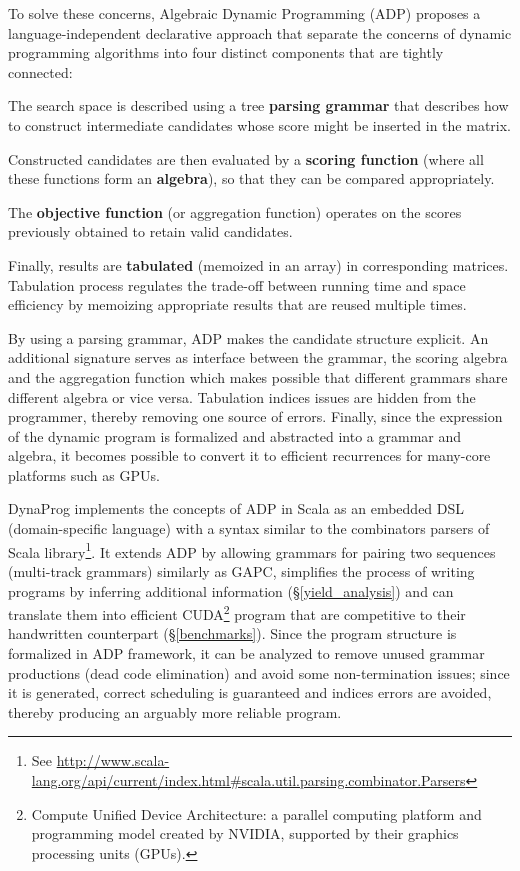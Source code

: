To solve these concerns, Algebraic Dynamic Programming (ADP) \cite{adp} proposes a language-independent declarative approach that separate the concerns of dynamic programming algorithms into four distinct components that are tightly connected:\ol
\item The search space is described using a tree \textbf{parsing grammar} that describes how to construct intermediate candidates whose score might be inserted in the matrix.
\item Constructed candidates are then evaluated by a \textbf{scoring function} (where all these functions form an \textbf{algebra}), so that they can be compared appropriately.
\item The \textbf{objective function} (or aggregation function) operates on the scores previously obtained to retain valid candidates.
\item Finally, results are \textbf{tabulated} (memoized in an array) in corresponding matrices. Tabulation process regulates the trade-off between running time and space efficiency by memoizing appropriate results that are reused multiple times.
\ole

By using a parsing grammar, ADP makes the candidate structure explicit. An additional signature serves as interface between the grammar, the scoring algebra and the aggregation function which makes possible that different grammars share different algebra or vice versa. Tabulation indices issues are hidden from the programmer, thereby removing one source of errors. Finally, since the expression of the dynamic program is formalized and abstracted into a grammar and algebra, it becomes possible to convert it to efficient recurrences for many-core platforms such as GPUs. \cite{adp_gpu}

DynaProg implements the concepts of ADP in Scala as an embedded DSL (domain-specific language) with a syntax similar to the combinators parsers of Scala library\footnote{See \url{http://www.scala-lang.org/api/current/index.html\#scala.util.parsing.combinator.Parsers}}. It extends ADP by allowing grammars for pairing two sequences (multi-track grammars) similarly as GAPC\cite{gapc_thesis}, simplifies the process of writing programs by inferring additional information (\S\ref{yield_analysis}) and can translate them into efficient CUDA\footnote{Compute Unified Device Architecture: a parallel computing platform and programming model created by NVIDIA, supported by their graphics processing units (GPUs).} program that are competitive to their handwritten counterpart (\S\ref{benchmarks}). Since the program structure is formalized in ADP framework, it can be analyzed to remove unused grammar productions (dead code elimination) and avoid some non-termination issues; since it is generated, correct scheduling is guaranteed and indices errors are avoided, thereby producing an arguably more reliable program.

